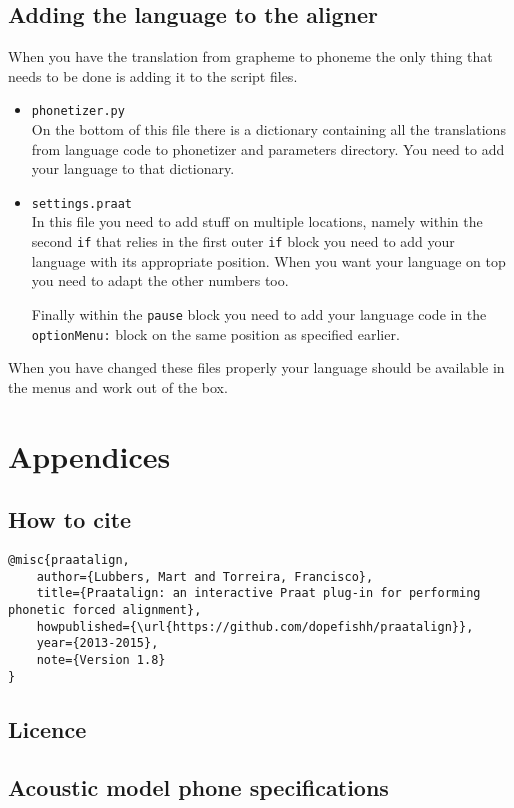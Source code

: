 \section{Adding the language to the aligner}
When you have the translation from grapheme to phoneme the only thing that
needs to be done is adding it to the script files.
\begin{itemize}
	\item \texttt{phonetizer.py}\\
		On the bottom of this file there is a dictionary containing all the
		translations from language code to phonetizer and parameters directory. You
		need to add your language to that dictionary.
	\item \texttt{settings.praat}\\
		In this file you need to add stuff on multiple locations, namely within the
		second \texttt{if} that relies in the first outer \texttt{if} block you
		need to add your language with its appropriate position. When you want your
		language on top you need to adapt the other numbers too.

		Finally within the \texttt{pause} block you need to add your language code
		in the \texttt{optionMenu:} block on the same position as specified
		earlier.
\end{itemize}
When you have changed these files properly your language should be available in
the menus and work out of the box.

\chapter{Appendices}
\section{How to cite}
\begin{lstlisting}[caption={Bibtex snippet},breaklines=true]
@misc{praatalign,
	author={Lubbers, Mart and Torreira, Francisco},
	title={Praatalign: an interactive Praat plug-in for performing phonetic forced alignment},
	howpublished={\url{https://github.com/dopefishh/praatalign}},
	year={2013-2015},
	note={Version 1.8}
}
\end{lstlisting}

\section{Licence}


\section{Acoustic model phone specifications}\label{sec:models}
